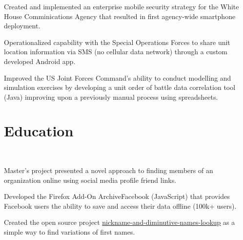 \documentclass[]{deedy-resume-openfont}
\begin{document}
\sectionsep
{}\hfill {}
\begin{tightemize}
	\item Created and implemented an enterprise mobile security strategy for the White House Comminications Agency that resulted in first agency-wide smartphone deployment.
	\item Operationalized capability with the Special Operations Forces to share unit location information via SMS (no cellular data network) through a custom developed Android app.
\end{tightemize}
\sectionsep
{}\hfill {}
\begin{tightemize}
	\item Improved the US Joint Forces Command's ability to conduct modelling and simulation exercises by developing a unit order of battle data correlation tool (Java) improving upon a previously manual process using spreadsheets.
\end{tightemize}
\sectionsep


%
%
\section{Education}
\raggedright

\hfill {}\\
\begin{tightemize}
	\item Master's project presented a novel approach to finding members of an organization online using social media profile friend links.
\end{tightemize}
\sectionsep
{}\hfill {}
\begin{tightemize}
	\item Developed the Firefox Add-On ArchiveFacebook (JavaScript) that provides Facebook users the ability to save and access their data offline (100k+ users).
	\item Created the open source project \href{https://github.com/carltonnorthern/nickname-and-diminutive-names-lookup}{nickname-and-diminutive-names-lookup} as a simple way to find variations of first names.
\end{tightemize}
\sectionsep
\end{document}
